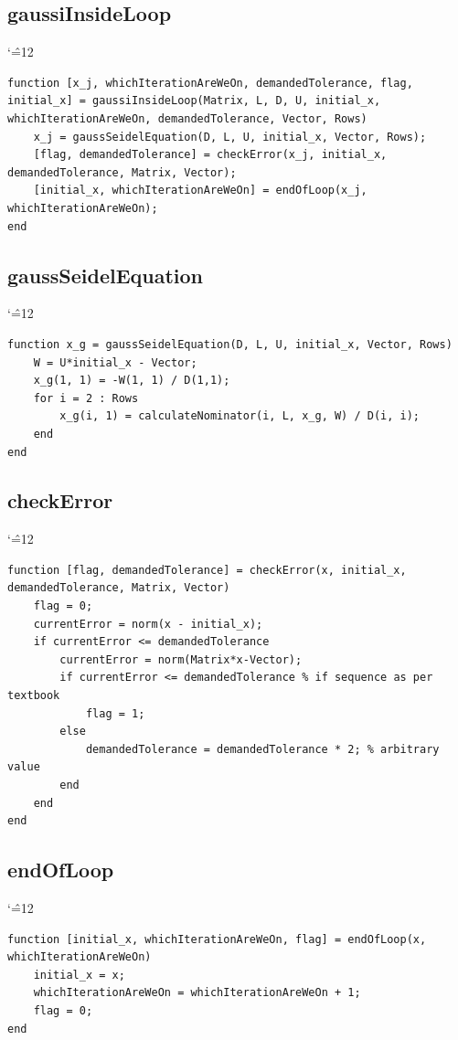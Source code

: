 \documentclass[12pt]{report}
\newenvironment{simplechar}{%
   \catcode`\^=12
}{}
\begin{document}
\subsection{gaussiInsideLoop}
\begin{simplechar}
\begin{lstlisting}
function [x_j, whichIterationAreWeOn, demandedTolerance, flag, initial_x] = gaussiInsideLoop(Matrix, L, D, U, initial_x, whichIterationAreWeOn, demandedTolerance, Vector, Rows)
    x_j = gaussSeidelEquation(D, L, U, initial_x, Vector, Rows);
    [flag, demandedTolerance] = checkError(x_j, initial_x, demandedTolerance, Matrix, Vector);
    [initial_x, whichIterationAreWeOn] = endOfLoop(x_j, whichIterationAreWeOn);
end
\end{lstlisting}
\end{simplechar}

\newpage
\subsection{gaussSeidelEquation}
\begin{simplechar}
\begin{lstlisting}
function x_g = gaussSeidelEquation(D, L, U, initial_x, Vector, Rows)
    W = U*initial_x - Vector;
    x_g(1, 1) = -W(1, 1) / D(1,1);
    for i = 2 : Rows
        x_g(i, 1) = calculateNominator(i, L, x_g, W) / D(i, i);
    end
end
\end{lstlisting}
\end{simplechar}

\subsection{checkError}
\begin{simplechar}
\begin{lstlisting}
function [flag, demandedTolerance] = checkError(x, initial_x, demandedTolerance, Matrix, Vector)
    flag = 0;
    currentError = norm(x - initial_x);
    if currentError <= demandedTolerance
        currentError = norm(Matrix*x-Vector);
        if currentError <= demandedTolerance % if sequence as per textbook
            flag = 1;
        else
            demandedTolerance = demandedTolerance * 2; % arbitrary value
        end
    end
end
\end{lstlisting}
\end{simplechar}

\newpage
\subsection{endOfLoop}
\begin{simplechar}
\begin{lstlisting}
function [initial_x, whichIterationAreWeOn, flag] = endOfLoop(x, whichIterationAreWeOn)
    initial_x = x;
    whichIterationAreWeOn = whichIterationAreWeOn + 1;
    flag = 0;
end
\end{lstlisting}
\end{simplechar}
\end{document}
